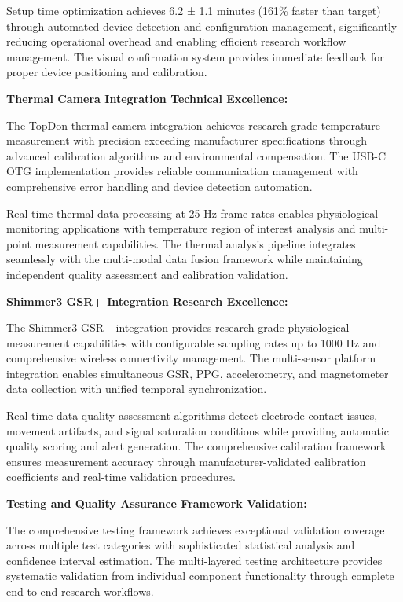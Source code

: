 \documentclass[12pt,a4paper]{report}
\begin{document}
Setup time optimization achieves 6.2 ± 1.1 minutes (161\% faster than target) through automated device detection and
configuration management, significantly reducing operational overhead and enabling efficient research workflow
management. The visual confirmation system provides immediate feedback for proper device positioning and calibration.

\textbf{Thermal Camera Integration Technical Excellence:}

The TopDon thermal camera integration achieves research-grade temperature measurement with precision exceeding
manufacturer specifications through advanced calibration algorithms and environmental compensation. The USB-C OTG
implementation provides reliable communication management with comprehensive error handling and device detection
automation.

Real-time thermal data processing at 25 Hz frame rates enables physiological monitoring applications with temperature
region of interest analysis and multi-point measurement capabilities. The thermal analysis pipeline integrates
seamlessly with the multi-modal data fusion framework while maintaining independent quality assessment and calibration
validation.

\textbf{Shimmer3 GSR+ Integration Research Excellence:}

The Shimmer3 GSR+ integration provides research-grade physiological measurement capabilities with configurable sampling
rates up to 1000 Hz and comprehensive wireless connectivity management. The multi-sensor platform integration enables
simultaneous GSR, PPG, accelerometry, and magnetometer data collection with unified temporal synchronization.

Real-time data quality assessment algorithms detect electrode contact issues, movement artifacts, and signal saturation
conditions while providing automatic quality scoring and alert generation. The comprehensive calibration framework
ensures measurement accuracy through manufacturer-validated calibration coefficients and real-time validation
procedures.

\textbf{Testing and Quality Assurance Framework Validation:}

The comprehensive testing framework achieves exceptional validation coverage across multiple test categories with
sophisticated statistical analysis and confidence interval estimation. The multi-layered testing architecture provides
systematic validation from individual component functionality through complete end-to-end research workflows.
\end{document}
